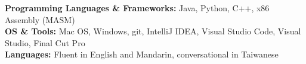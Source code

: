 

\begin{cvparagraph}

\textbf{Programming Languages \& Frameworks:} Java, Python, C++, x86 Assembly (MASM)
\\[2pt]
\textbf{OS \& Tools:} Mac OS, Windows, git, IntelliJ IDEA, Visual Studio Code, Visual Studio, Final Cut Pro
\\[2pt]
\textbf{Languages:} Fluent in English and Mandarin, conversational in Taiwanese


\end{cvparagraph}
